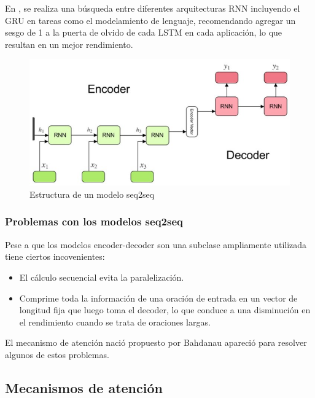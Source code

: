 \documentclass[conference]{IEEEtran}
\begin{document}
\vspace{0.2cm}

En \cite{b20}, se realiza una b\'usqueda entre diferentes arquitecturas RNN incluyendo el GRU en tareas como el modelamiento de lenguaje, recomendando agregar un sesgo de 1 a la puerta de olvido de cada LSTM en cada aplicaci\'on, lo que resultan en un mejor rendimiento.

\begin{figure}[h]
	\centering
	\includegraphics[scale=.3]{imagenes/seq2seq.jpg}
	\caption{Estructura de un modelo seq2seq} 
\end{figure}

\subsubsection{Problemas con los modelos seq2seq}

Pese a que los  modelos encoder-decoder son una subclase ampliamente utilizada tiene ciertos incovenientes:

\begin{itemize}
\item El c\'alculo secuencial evita la paralelizaci\'on.
	\item Comprime toda la informaci\'on de una oraci\'on de entrada en un vector de longitud fija que luego toma el decoder, lo que conduce a una disminuci\'on en el rendimiento cuando se trata de oraciones largas. 
\end{itemize}

El mecanismo de atenci\'on naci\'o propuesto por Bahdanau \cite{b2} apareci\'o para resolver algunos de estos problemas.

\subsection{Mecanismos de atenci\'on}
\end{document}
